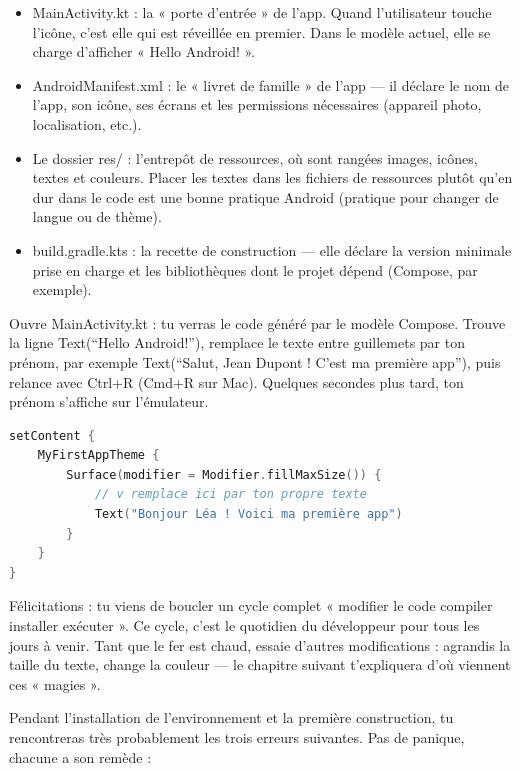 \begin{itemize}
  \item MainActivity.kt : la « porte d'entrée » de l'app. Quand l'utilisateur touche l'icône, c'est elle qui est réveillée en premier. Dans le modèle actuel, elle se charge d'afficher « Hello Android! ».
  \item AndroidManifest.xml : le « livret de famille » de l'app — il déclare le nom de l'app, son icône, ses écrans et les permissions nécessaires (appareil photo, localisation, etc.).
  \item Le dossier res/ : l'entrepôt de ressources, où sont rangées images, icônes, textes et couleurs. Placer les textes dans les fichiers de ressources plutôt qu'en dur dans le code est une bonne pratique Android (pratique pour changer de langue ou de thème).
  \item build.gradle.kts : la recette de construction — elle déclare la version minimale prise en charge et les bibliothèques dont le projet dépend (Compose, par exemple).
\end{itemize}


Ouvre MainActivity.kt : tu verras le code généré par le modèle Compose. Trouve la ligne Text(“Hello Android!”), remplace le texte entre guillemets par ton prénom, par exemple Text(“Salut, Jean Dupont ! C'est ma première app”), puis relance avec Ctrl+R (Cmd+R sur Mac). Quelques secondes plus tard, ton prénom s'affiche sur l'émulateur.

\begin{lstlisting}[language=Kotlin]
setContent {
    MyFirstAppTheme {
        Surface(modifier = Modifier.fillMaxSize()) {
            // v remplace ici par ton propre texte
            Text("Bonjour Léa ! Voici ma première app")
        }
    }
}
\end{lstlisting}

Félicitations : tu viens de boucler un cycle complet « modifier le code compiler installer exécuter ». Ce cycle, c'est le quotidien du développeur pour tous les jours à venir. Tant que le fer est chaud, essaie d'autres modifications : agrandis la taille du texte, change la couleur — le chapitre suivant t'expliquera d'où viennent ces « magies ».


Pendant l'installation de l'environnement et la première construction, tu rencontreras très probablement les trois erreurs suivantes. Pas de panique, chacune a son remède :

